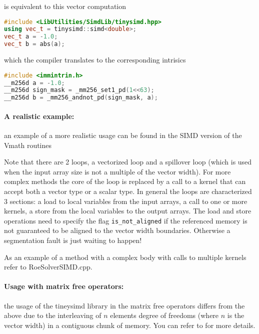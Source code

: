 is equivalent to this vector computation

\begin{lstlisting}[language=C++]
#include <LibUtilities/SimdLib/tinysimd.hpp>
using vec_t = tinysimd::simd<double>;
vec_t a = -1.0;
vec_t b = abs(a);
\end{lstlisting}

which the compiler translates to the corresponding intrisics

\begin{lstlisting}[language=C++]
#include <immintrin.h>
__m256d a = -1.0;
__m256d sign_mask = _mm256_set1_pd(1<<63);
__m256d b = _mm256_andnot_pd(sign_mask, a);
\end{lstlisting}

\paragraph{A realistic example: } an example of a more realistic usage can be found in the SIMD version of the Vmath routines



Note that there are 2 loops, a vectorized loop and a spillover loop (which is used when the input array size is not a multiple of the vector width).
For more complex methods the core of the loop is replaced by a call to a kernel that can accept both a vector type or a scalar type.
In general the loops are characterized 3 sections: a load to local variables from the input arrays, a call to one or more kernels, a store from the local variables to the output arrays.
The load and store operations need to specify the flag \verb+is_not_aligned+ if the referenced memory is not guaranteed to be aligned to the vector width boundaries.
Otherwise a segmentation fault is just waiting to happen!

As an example of a method with a complex body with calls to multiple kernels refer to RoeSolverSIMD.cpp.

\paragraph{Usage with matrix free operators: }
the usage of the tineysimd library in the matrix free operators differs from the above due to the interleaving of $n$ elements degree of freedoms (where $n$ is the vector width) in a contiguous chunk of memory.
You can refer to \cite{moxey2020efficient} for more details.

